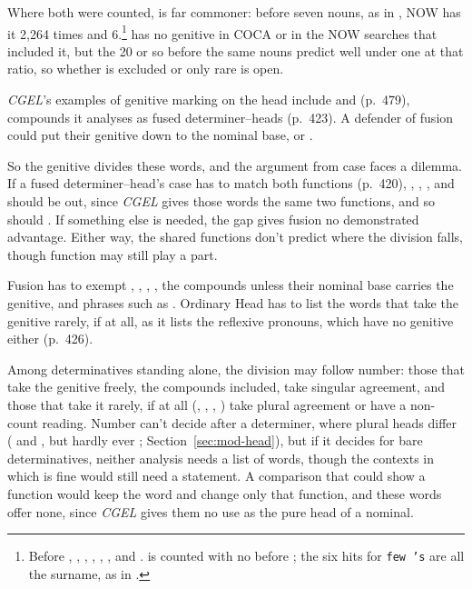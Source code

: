 Where both were counted,  is far commoner: before seven nouns, as in , NOW has it 2,264 times and  6.\footnote{Before , , , , , , and .  is counted with no  before ; the six hits for \texttt{few 's} are all the surname, as in .}  has no genitive in COCA or in the NOW searches that included it, but the 20 or so  before the same nouns predict well under one  at that ratio, so whether  is excluded or only rare is open.

\textit{CGEL}'s examples of genitive marking on the head include  and  (p.~479), compounds it analyses as fused determiner--heads (p.~423). A defender of fusion could put their genitive down to the nominal base,  or .

So the genitive divides these words, and the argument from case faces a dilemma. If a fused determiner--head's case has to match both functions (p.~420), , , , and  should be out, since \textit{CGEL} gives those words the same two functions, and so should . If something else is needed, the gap gives fusion no demonstrated advantage. Either way, the shared functions don't predict where the division falls, though function may still play a part.

Fusion has to exempt , , , , the compounds unless their nominal base carries the genitive, and phrases such as . Ordinary Head has to list the words that take the genitive rarely, if at all, as it lists the reflexive pronouns, which have no genitive either (p.~426).

Among determinatives standing alone, the division may follow number: those that take the genitive freely, the compounds included, take singular agreement, and those that take it rarely, if at all (, , , ) take plural agreement or have a non-count reading. Number can't decide after a determiner, where plural heads differ ( and , but hardly ever ; Section~\ref{sec:mod-head}), but if it decides for bare determinatives, neither analysis needs a list of words, though the contexts in which  is fine would still need a statement. A comparison that could show a function would keep the word and change only that function, and these words offer none, since \textit{CGEL} gives them no use as the pure head of a nominal.

